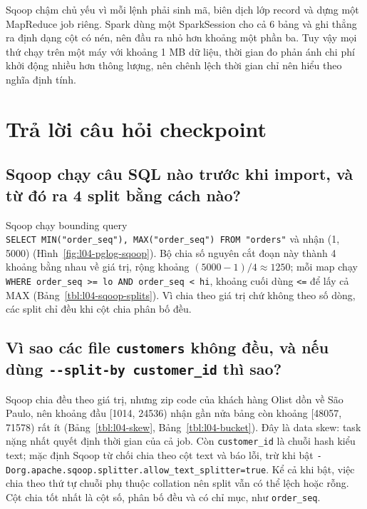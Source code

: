\documentclass[
  12pt,
  a4paper,
]{article}
\begin{document}
Sqoop chậm chủ yếu vì mỗi lệnh phải sinh mã, biên dịch lớp record và
dựng một MapReduce job riêng. Spark dùng một SparkSession cho cả 6 bảng
và ghi thẳng ra định dạng cột có nén, nên đầu ra nhỏ hơn khoảng một phần
ba. Tuy vậy mọi thứ chạy trên một máy với khoảng 1 MB dữ liệu, thời gian
đo phản ánh chi phí khởi động nhiều hơn thông lượng, nên chênh lệch thời
gian chỉ nên hiểu theo nghĩa định tính.

\section{Trả lời câu hỏi checkpoint}\label{sec:l04-discussion}

\subsection{Sqoop chạy câu SQL nào trước khi import, và từ đó ra 4 split
bằng cách nào?}\label{sec:l04-q1}

Sqoop chạy bounding query
\texttt{SELECT\ MIN("order\_}\allowbreak{}\texttt{seq"),}\allowbreak{}\texttt{\ MAX("order\_}\allowbreak{}\texttt{seq")\ FROM\ "orders"}\allowbreak{}
và nhận (1, 5000) (Hình~\ref{fig:l04-pglog-sqoop}). Bộ chia số nguyên
cắt đoạn này thành 4 khoảng bằng nhau về giá trị, rộng khoảng
\((5000-1)/4 \approx 1250\); mỗi map chạy
\texttt{WHERE\ order\_}\allowbreak{}\texttt{seq\ \textgreater{}=}\allowbreak{}\texttt{\ lo\ AND\ order\_}\allowbreak{}\texttt{seq\ \textless{}\ hi}\allowbreak{},
khoảng cuối dùng \texttt{\textless{}=} để lấy cả MAX
(Bảng~\ref{tbl:l04-sqoop-splits}). Vì chia theo giá trị chứ không theo
số dòng, các split chỉ đều khi cột chia phân bố đều.

\subsection{\texorpdfstring{Vì sao các file \texttt{customers} không
đều, và nếu dùng
\texttt{-\/-split-by\ customer\_}\allowbreak{}\texttt{id}\allowbreak{}
thì
sao?}{Vì sao các file customers không đều, và nếu dùng -\/-split-by customer\_id thì sao?}}\label{sec:l04-q2}

Sqoop chia đều theo giá trị, nhưng zip code của khách hàng Olist dồn về
São Paulo, nên khoảng đầu {[}1014, 24536) nhận gần nửa bảng còn khoảng
{[}48057, 71578) rất ít (Bảng~\ref{tbl:l04-skew},
Bảng~\ref{tbl:l04-bucket}). Đây là data skew: task nặng nhất quyết định
thời gian của cả job. Còn \texttt{customer\_id} là chuỗi hash kiểu text;
mặc định Sqoop từ chối chia theo cột text và báo lỗi, trừ khi bật
\texttt{-Dorg.}\allowbreak{}\texttt{apache.}\allowbreak{}\texttt{sqoop.}\allowbreak{}\texttt{splitter.}\allowbreak{}\texttt{allow\_}\allowbreak{}\texttt{text\_}\allowbreak{}\texttt{splitter=}\allowbreak{}\texttt{true}\allowbreak{}.
Kể cả khi bật, việc chia theo thứ tự chuỗi phụ thuộc collation nên split
vẫn có thể lệch hoặc rỗng. Cột chia tốt nhất là cột số, phân bố đều và
có chỉ mục, như \texttt{order\_seq}.
\end{document}
